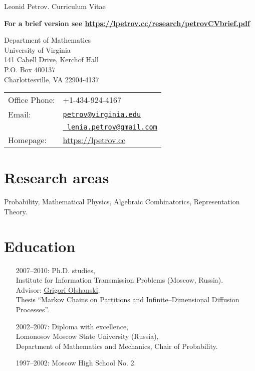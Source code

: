 \documentclass[letterpaper,11pt]{article}
\def\name{Leonid Petrov}
\begin{document}
{\huge \name{}. Curriculum Vitae}
\medskip

\textbf{For a brief version see \url{https://lpetrov.cc/research/petrovCVbrief.pdf}}

\noindent\hrulefill


\vspace{0.25in}

\begin{minipage}{0.45\linewidth}
	Department of Mathematics\\ University of Virginia\\ 141 Cabell Drive,
	Kerchof Hall\\ P.O. Box 400137\\ Charlottesville, VA 22904-4137
\end{minipage}
\begin{minipage}{0.45\linewidth}
	\begin{tabular}{ll}
		Office Phone: & +1-434-924-4167                           \\
		Email:        &
		\href{mailto:petrov@virginia.edu}{\tt petrov@virginia.edu}\\&
		\href{mailto:lenia.petrov@gmail.com}{\tt
			lenia.petrov@gmail.com}
		\\
		Homepage:     & \url{https://lpetrov.cc} \\
	\end{tabular}
\end{minipage}

\section*{Research areas}

Probability, Mathematical Physics, Algebraic Combinatorics, Representation
Theory.

\section*{Education}

\begin{itemize}
	\item
	      [2007--2010:]
	      Ph.D. studies,\\Institute for Information Transmission Problems
	      (Moscow, Russia). \\ Advisor:
	      \href{http://www.iitp.ru/en/userpages/88/}{Grigori Olshanski}.\\ Thesis
	      ``Markov Chains on Partitions and Infinite--Dimensional Diffusion Processes''.

	\item
	      [2002--2007:]
	      Diploma with excellence,\\ Lomonosov Moscow State University
	      (Russia),\\ Department of Mathematics and Mechanics, Chair of Probability.

	\item
	      [1997--2002:] Moscow High School No. 2.

\end{itemize}
\end{document}
